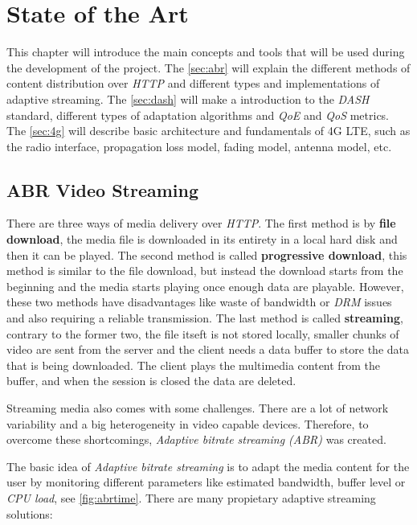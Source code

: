 \chapter{State of the Art}
\label{chap:soa}

This chapter will introduce the main concepts and tools that will be used during the development 
of the project. The \autoref{sec:abr} will explain the different methods of content distribution 
over \textit{HTTP} and different types and implementations of adaptive streaming.
The \autoref{sec:dash} will make a introduction to 
the \textit{DASH} standard, different types of adaptation algorithms and \textit{QoE} and 
\textit{QoS} metrics. The \autoref{sec:4g} will describe basic architecture and fundamentals
of 4G LTE, such as the radio interface, propagation loss model, fading model, antenna model, etc.

\section{ABR Video Streaming}
\label{sec:abr}

There are three ways of media delivery over \textit{HTTP}. The first method is by
\textbf{file download}, the media file is downloaded in its entirety in a local hard disk and 
then it can be played. The second method is called \textbf{progressive download}, this method
is similar to the file download, but instead the download starts from the beginning and the 
media starts playing once enough data are playable. 
However, these two methods have disadvantages like waste of bandwidth or
\textit{DRM} issues and also requiring a reliable transmission. The last method is called
\textbf{streaming}, contrary to the former two, the file itseft is not stored locally, 
smaller chunks of video are sent from the server and the client needs a data buffer to store 
the data that is being downloaded. The client plays the multimedia content from the 
buffer, and when the session is closed the data are deleted.

Streaming media also comes with some challenges. There are a lot of network variability
and a big heterogeneity in video capable devices. Therefore, to overcome these shortcomings,
\textit{Adaptive bitrate streaming (ABR)} was created.

The basic idea of \textit{Adaptive bitrate streaming} is to adapt the media content
for the user by monitoring different parameters like estimated bandwidth, buffer level or
\textit{CPU load}, see \autoref{fig:abrtime}. There are many propietary adaptive streaming solutions:

